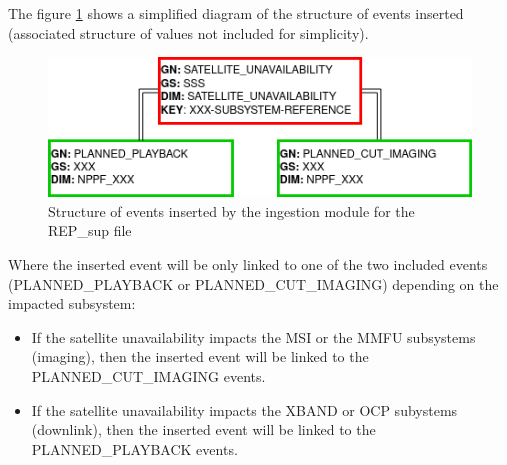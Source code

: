 The figure \ref{fg:structure_ingestion_sup_events} shows a simplified diagram of the structure of events inserted (associated structure of values not included for simplicity).

\begin{figure}[H]
  \begin{center}
	\centering\includegraphics[scale=0.7]{../fig/structure_ingestion_sup.png}
	\caption{Structure of events inserted by the ingestion module for the REP\_\acrshort{sup} file}
	\label{fg:structure_ingestion_sup_events}
  \end{center}
\end{figure}

Where the inserted event will be only linked to one of the two included events (PLANNED\_PLAYBACK or PLANNED\_CUT\_IMAGING) depending on the impacted subsystem:

\begin{itemize}

\item If the satellite unavailability impacts the MSI or the MMFU subsystems (imaging), then the inserted event will be linked to the PLANNED\_CUT\_IMAGING events.

\item If the satellite unavailability impacts the XBAND or OCP subystems (downlink), then the inserted event will be linked to the PLANNED\_PLAYBACK events.

\end{itemize} 

